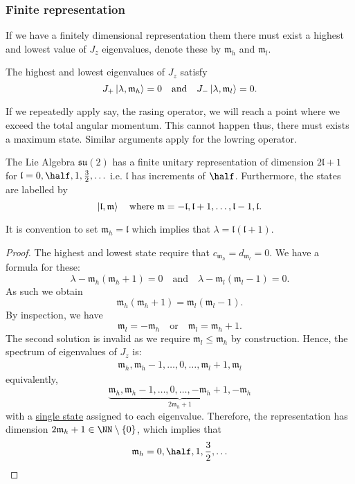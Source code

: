 \documentclass[12pt, a4paper]{article}
\begin{document}
\subsubsection*{Finite representation}

If we have a finitely dimensional representation them there must exist a highest and lowest value of \(J_z\) eigenvalues, denote these by \(\mathfrak{m}_h\) and \(\mathfrak{m}_l\).

\begin{mdthm}
    The highest and lowest eigenvalues of \(J_z\) satisfy 
    \[J_+ \ket{\lambda,\mathfrak{m}_h} = 0 \quad \text{and} \quad J_- \ket{\lambda,\mathfrak{m}_l}=0.\]
\end{mdthm}

\begin{mdnote}
    If we repeatedly apply say, the rasing operator, we will reach a point where we exceed the total angular momentum. This cannot happen thus, there must exists a maximum state. Similar arguments apply for the lowring operator.
\end{mdnote}

\begin{mdcor}
    The Lie Algebra \(\mathfrak{su}(2)\) has a finite unitary representation of dimension \(2\mathfrak{l}+1\) for \(\mathfrak{l}=0,\half,1,\frac{3}{2},\ldots\) i.e. \(\mathfrak{l}\) has increments of \(\half\). Furthermore, the states are labelled by 
    \[\ket{\mathfrak{l},\mathfrak{m}} \quad \text{where } \mathfrak{m}=-\mathfrak{l},\mathfrak{l}+1,\ldots,\mathfrak{l}-1,\mathfrak{l}.\]
\end{mdcor}

\begin{mdnote}
    It is convention to set \(\mathfrak{m}_h=\mathfrak{l}\) which implies that \(\lambda=\mathfrak{l}(\mathfrak{l}+1)\).
\end{mdnote}

\begin{proof}
    The highest and lowest state require that \(c_{\mathfrak{m}_h}=d_{\mathfrak{m}_l}=0\). We have a formula for these:
    \[\lambda-\mathfrak{m}_h(\mathfrak{m}_h+1)=0 \quad \text{and} \quad \lambda-\mathfrak{m}_l(\mathfrak{m}_l-1)=0.\]
    As such we obtain
    \[\mathfrak{m}_h(\mathfrak{m}_h+1)=\mathfrak{m}_l(\mathfrak{m}_l-1).\]
    By inspection, we have 
    \[\mathfrak{m}_l=-\mathfrak{m}_h \quad \text{or}\quad \mathfrak{m}_l = \mathfrak{m}_h+1.\]
    The second solution is invalid as we require \(\mathfrak{m}_l \leq \mathfrak{m}_h\) by construction. Hence, the spectrum of eigenvalues of \(J_z\) is:
    \[\begin{aligned}
        \mathfrak{m}_h,\mathfrak{m}_h-1,\ldots,0,\ldots,\mathfrak{m}_l+1,\mathfrak{m}_l
    \end{aligned}\]
    equivalently,
    \[\underbrace{\mathfrak{m}_h,\mathfrak{m}_h-1,\ldots,0,\ldots,-\mathfrak{m}_h+1,-\mathfrak{m}_h}_{2\mathfrak{m}_h+1}\]
    with a \underline{single state} assigned to each eigenvalue. Therefore, the representation has dimension \(2\mathfrak{m}_h+1 \in \NN\setminus\{0\}\), which implies that 
    \[\mathfrak{m}_h=0,\half,1,\frac{3}{2},\ldots\]
\end{proof}
\end{document}
